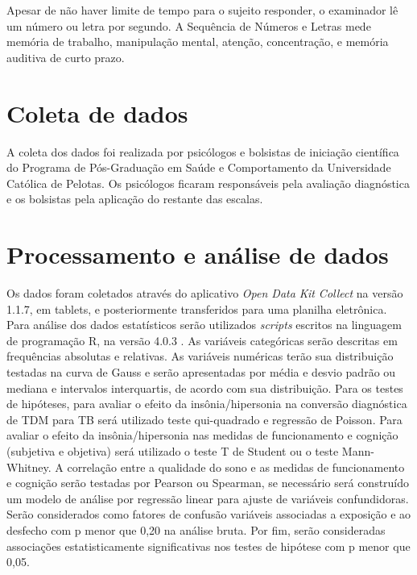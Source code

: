 \documentclass[chapter=TITLE,
               oneside,
               12pt,
               a4paper,
               english,
               brazil]{abntex2}    %
\begin{document}
            Apesar de não haver limite de tempo para o sujeito responder,
            o examinador lê um número ou letra por segundo.
            A Sequência de Números e Letras mede memória de trabalho,
            manipulação mental, atenção, concentração,
            e memória auditiva de curto prazo. \parencite{wechsler_wais_2004}

\section{Coleta de dados}\label{sec:coleta}

    A coleta dos dados foi realizada por psicólogos e bolsistas de iniciação
    científica do Programa de Pós-Graduação em Saúde e Comportamento da
    Universidade Católica de Pelotas.
    Os psicólogos ficaram responsáveis pela avaliação
    diagnóstica e os bolsistas pela aplicação do restante das escalas.

\section{Processamento e análise de dados}\label{sec:analise}

    Os dados foram coletados através do aplicativo \textit{Open Data Kit Collect}
    na versão 1.1.7, em tablets, e posteriormente transferidos para uma planilha
    eletrônica. Para análise dos dados estatísticos serão utilizados
    \textit{scripts} escritos na linguagem de programação R, na versão 4.0.3
    \parencite{r_language}.
    As variáveis categóricas serão descritas em frequências absolutas e relativas.
    As variáveis numéricas terão sua distribuição testadas na curva de Gauss e serão
    apresentadas por média e desvio padrão ou mediana e intervalos interquartis,
    de acordo com sua distribuição.
    Para os testes de hipóteses, para avaliar o efeito da insônia/hipersonia na
    conversão diagnóstica de TDM para TB será utilizado teste qui-quadrado e
    regressão de Poisson. Para avaliar o efeito da insônia/hipersonia nas medidas
    de funcionamento e cognição (subjetiva e objetiva) será utilizado o teste T
    de Student ou o teste Mann-Whitney.
    A correlação entre a qualidade do sono e as medidas de funcionamento e cognição
    serão testadas por Pearson ou Spearman, se necessário será construído um modelo
    de análise por regressão linear para ajuste de variáveis confundidoras.
    Serão considerados como fatores de confusão variáveis associadas a exposição
    e ao desfecho com p menor que 0,20 na análise bruta. Por fim, serão consideradas
    associações estatisticamente significativas nos testes de hipótese com p
    menor que 0,05.
\end{document}
